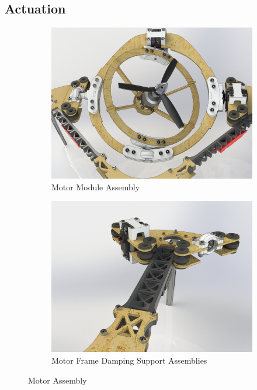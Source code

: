 \subsection{Actuation}
\label{subsec:proto.design.actuation}
\begin{figure}[hbtp]
\begin{subfigure}{.5\textwidth}
\centering
\includegraphics[width=\textwidth]{figs/motor-assembly}
\caption{Motor Module Assembly}
\label{fig:motor_assembly}
\end{subfigure}
\begin{subfigure}{.5\textwidth}
\centering
\includegraphics[width=\textwidth]{figs/motor-support}
\caption{Motor Frame Damping Support Assemblies}
\label{fig:motor_support}
\end{subfigure}
\caption{Motor Assembly}
\end{figure}
